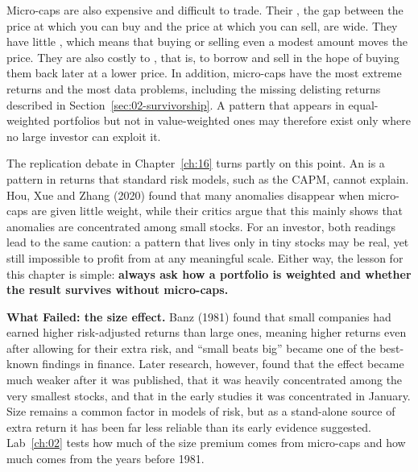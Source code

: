 Micro-caps are also expensive and difficult to trade. Their \label{kt:bid-ask-spread}, the gap between the price at which you can buy and the price at which you can sell, are wide. They have little , which means that buying or selling even a modest amount moves the price. They are also costly to , that is, to borrow and sell in the hope of buying them back later at a lower price. In addition, micro-caps have the most extreme returns and the most data problems, including the missing delisting returns described in Section~\ref{sec:02-survivorship}. A pattern that appears in equal-weighted portfolios but not in value-weighted ones may therefore exist only where no large investor can exploit it.

The replication debate in Chapter~\ref{ch:16} turns partly on this point. An  is a pattern in returns that standard risk models, such as the CAPM, cannot explain. Hou, Xue and Zhang (2020) found that many anomalies disappear when micro-caps are given little weight, while their critics argue that this mainly shows that anomalies are concentrated among small stocks. For an investor, both readings lead to the same caution: a pattern that lives only in tiny stocks may be real, yet still impossible to profit from at any meaningful scale. Either way, the lesson for this chapter is simple: \textbf{always ask how a portfolio is weighted and whether the result survives without micro-caps.}

\begin{callout}
\textbf{What Failed: the size effect.} Banz (1981) found that small companies had earned higher risk-adjusted returns than large ones, meaning higher returns even after allowing for their extra risk, and ``small beats big'' became one of the best-known findings in finance. Later research, however, found that the effect became much weaker after it was published, that it was heavily concentrated among the very smallest stocks, and that in the early studies it was concentrated in January. Size remains a common factor in models of risk, but as a stand-alone source of extra return it has been far less reliable than its early evidence suggested. Lab~\ref{ch:02} tests how much of the size premium comes from micro-caps and how much comes from the years before 1981.
\end{callout}

